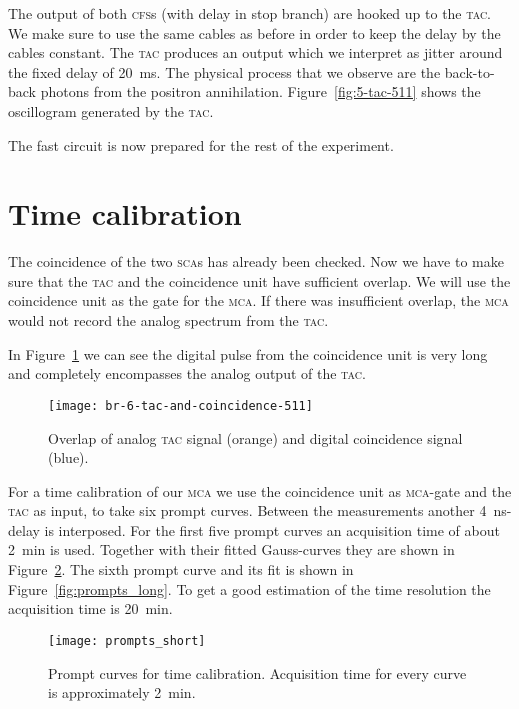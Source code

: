 \documentclass[11pt, english, fleqn, DIV=15, headinclude, BCOR=2cm]{scrreprt}
\begin{document}
The output of both \textsc{cfs}s (with delay in stop branch) are hooked up to
the \textsc{tac}. We make sure to use the same cables as before in order to
keep the delay by the cables constant. The \textsc{tac} produces an output
which we interpret as jitter around the fixed delay of \SI{20}{\milli\second}.
The physical process that we observe are the back-to-back photons from the
positron annihilation. Figure~\ref{fig:5-tac-511} shows the oscillogram
generated by the \textsc{tac}.

The fast circuit is now prepared for the rest of the experiment.

\section{Time calibration}

The coincidence of the two \textsc{sca}s has already been checked. Now we have
to make sure that the \textsc{tac} and the coincidence unit have sufficient
overlap. We will use the coincidence unit as the gate for the \textsc{mca}. If
there was insufficient overlap, the \textsc{mca} would not record the analog
spectrum from the \textsc{tac}.

In Figure~\ref{fig:6-tac-and-coincidence-511} we can see the digital pulse from
the coincidence unit is very long and completely encompasses the analog output
of the \textsc{tac}.

\begin{figure}
    \centering
    \texttt{[image: br-6-tac-and-coincidence-511]}
    \caption{%
        Overlap of analog \textsc{tac} signal (orange) and digital coincidence
        signal (blue).
    }
    \label{fig:6-tac-and-coincidence-511}
\end{figure}

For a time calibration of our \textsc{mca} we use the coincidence unit as
\textsc{mca}-gate and the \textsc{tac} as input, to take six prompt curves.
Between the measurements another \SI{4}{\nano\second}-delay is interposed. For
the first five prompt curves an acquisition time of about \SI{2}{\minute} is
used.  Together with their fitted Gauss-curves they are shown in
Figure~\ref{fig:prompts_short}. The sixth prompt curve and its fit is shown in
Figure~\ref{fig:prompts_long}. To get a good estimation of the time resolution
the acquisition time is \SI{20}{\minute}.

\begin{figure}
\centering
        \texttt{[image: prompts\_short]}
        \caption{%
                Prompt curves for time calibration. Acquisition time for every
                curve is approximately \SI{2}{\minute}.
        }
        \label{fig:prompts_short}
\end{figure}
        
\end{document}
